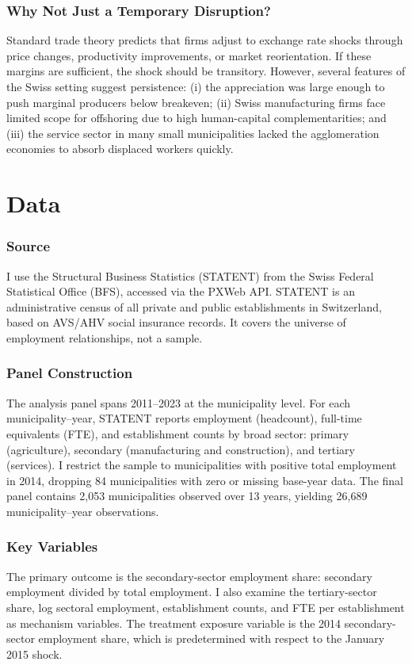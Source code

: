 \documentclass[12pt]{article}
\begin{document}
\subsubsection*{Why Not Just a Temporary Disruption?} Standard trade theory predicts that firms adjust to exchange rate shocks through price changes, productivity improvements, or market reorientation. If these margins are sufficient, the shock should be transitory. However, several features of the Swiss setting suggest persistence: (i) the appreciation was large enough to push marginal producers below breakeven; (ii) Swiss manufacturing firms face limited scope for offshoring due to high human-capital complementarities; and (iii) the service sector in many small municipalities lacked the agglomeration economies to absorb displaced workers quickly.


\section{Data}
\label{sec:data}

\subsubsection*{Source} I use the Structural Business Statistics (STATENT) from the Swiss Federal Statistical Office (BFS), accessed via the PXWeb API. STATENT is an administrative census of all private and public establishments in Switzerland, based on AVS/AHV social insurance records. It covers the universe of employment relationships, not a sample.

\subsubsection*{Panel Construction} The analysis panel spans 2011--2023 at the municipality level. For each municipality--year, STATENT reports employment (headcount), full-time equivalents (FTE), and establishment counts by broad sector: primary (agriculture), secondary (manufacturing and construction), and tertiary (services). I restrict the sample to municipalities with positive total employment in 2014, dropping 84 municipalities with zero or missing base-year data. The final panel contains 2,053 municipalities observed over 13 years, yielding 26,689 municipality--year observations.

\subsubsection*{Key Variables} The primary outcome is the secondary-sector employment share: secondary employment divided by total employment. I also examine the tertiary-sector share, log sectoral employment, establishment counts, and FTE per establishment as mechanism variables. The treatment exposure variable is the 2014 secondary-sector employment share, which is predetermined with respect to the January 2015 shock.
\end{document}
